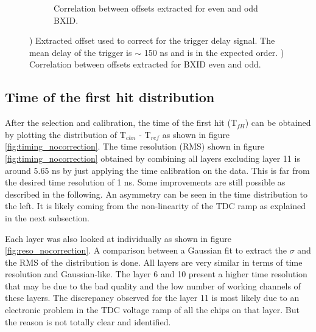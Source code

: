 \begin{figure}[htbp!]
\begin{subfigure}[t]{0.5\textwidth}
		\caption{Correlation between offsets extracted for even and odd BXID.}\label{fig:BXID_offset}
	\end{subfigure}
	\caption{) Extracted offset used to correct for the trigger delay signal. The mean delay of the trigger is $\sim$ 150 ns and is in the expected order. ) Correlation between offsets extracted for BXID even and odd.}
\end{figure}

\subsection{Time of the first hit distribution}

After the selection and calibration, the time of the first hit (T$_{fH}$) can be obtained by plotting the distribution of T$_{chn}$ - T$_{ref}$ as shown in figure \ref{fig:timing_nocorrection}. The time resolution (RMS) shown in figure \ref{fig:timing_nocorrection} obtained by combining all layers excluding layer 11 is around 5.65 ns by just applying the time calibration on the data. This is far from the desired time resolution of 1 ns. Some improvements are still possible as described in the following. An asymmetry can be seen in the time distribution to the left. It is likely coming from the non-linearity of the TDC ramp as explained in the next subsection.

Each layer was also looked at individually as shown in figure \ref{fig:reso_nocorrection}. A comparison between a Gaussian fit to extract the $\sigma$ and the RMS of the distribution is done. All layers are very similar in terms of time resolution and Gaussian-like. The layer 6 and 10 present a higher time resolution that may be due to the bad quality and the low number of working channels of these layers. The discrepancy observed for the layer 11 is most likely due to an electronic problem in the TDC voltage ramp of all the chips on that layer. But the reason is not totally clear and identified.

